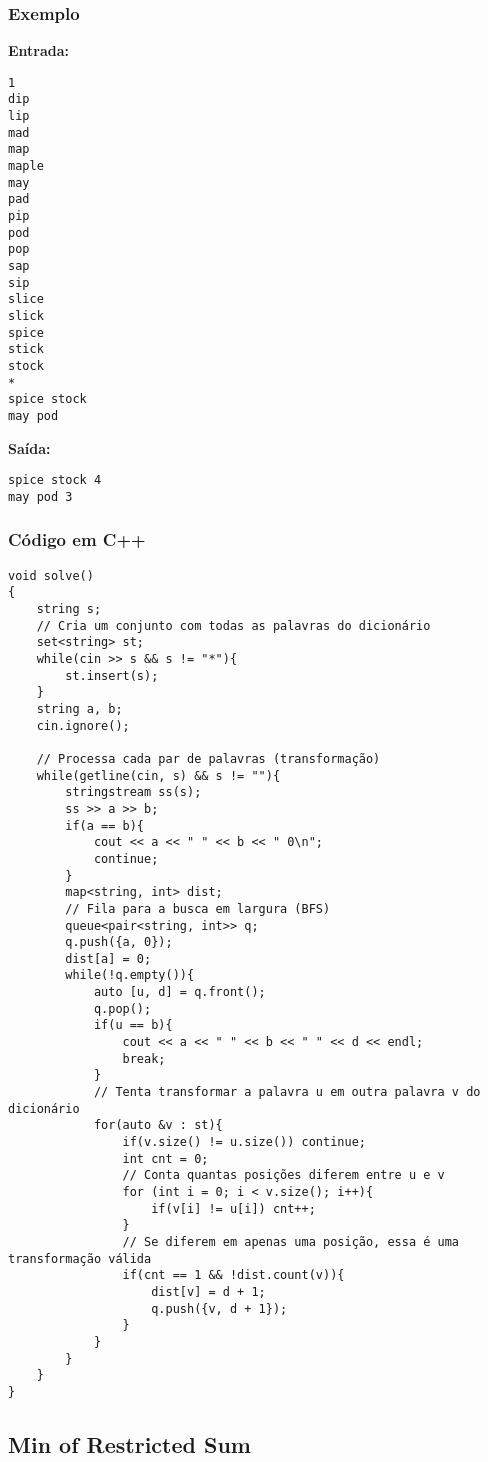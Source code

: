 \subsubsection*{Exemplo}

\textbf{Entrada:}
\begin{verbatim}
1
dip
lip
mad
map
maple
may
pad
pip
pod
pop
sap
sip
slice
slick
spice
stick
stock
*
spice stock
may pod
\end{verbatim}

\textbf{Saída:}
\begin{verbatim}
spice stock 4
may pod 3
\end{verbatim}

\subsubsection*{Código em C++}
\begin{lstlisting}
void solve()
{
    string s;
    // Cria um conjunto com todas as palavras do dicionário
    set<string> st;
    while(cin >> s && s != "*"){
        st.insert(s);
    }
    string a, b;
    cin.ignore();
    
    // Processa cada par de palavras (transformação)
    while(getline(cin, s) && s != ""){
        stringstream ss(s);
        ss >> a >> b;
        if(a == b){
            cout << a << " " << b << " 0\n";
            continue;
        }
        map<string, int> dist;
        // Fila para a busca em largura (BFS)
        queue<pair<string, int>> q;
        q.push({a, 0});
        dist[a] = 0;
        while(!q.empty()){
            auto [u, d] = q.front();
            q.pop();
            if(u == b){
                cout << a << " " << b << " " << d << endl;
                break;
            }
            // Tenta transformar a palavra u em outra palavra v do dicionário
            for(auto &v : st){
                if(v.size() != u.size()) continue;
                int cnt = 0;
                // Conta quantas posições diferem entre u e v
                for (int i = 0; i < v.size(); i++){
                    if(v[i] != u[i]) cnt++;
                }
                // Se diferem em apenas uma posição, essa é uma transformação válida
                if(cnt == 1 && !dist.count(v)){
                    dist[v] = d + 1;
                    q.push({v, d + 1});
                }
            }
        }
    }
}
\end{lstlisting}


\subsection{Min of Restricted Sum}

